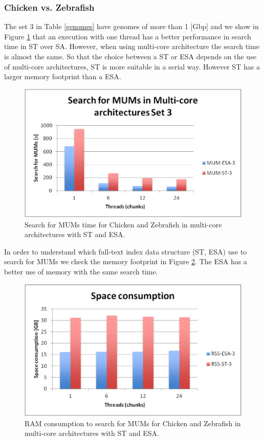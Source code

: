 \documentclass[runningheads,a4paper]{llncs}
\begin{document}
\subsubsection{Chicken vs. Zebrafish}
The set 3 in Table \ref{genomes} have genomes of more than 1 [Gbp] and we show in Figure \ref{fig:chicken-mum} that an execution with one thread has a better performance in search time in ST over SA. However, when using multi-core architecture the search time is almost the same. So that the choice between a ST or ESA depends on the use of multi-core architectures, ST is more suitable in a serial way. However ST has a larger memory footprint than a ESA.
\begin{figure}[h]
  \centering
  \includegraphics[scale=0.3]{chicken-MUM.eps}
  \caption{Search for MUMs time for Chicken and Zebrafish in multi-core architectures with ST and ESA.}
  \label{fig:chicken-mum}
\end{figure}  
In order to understand which full-text index data structure (ST, ESA) use to search for MUMs we check the memory footprint in Figure \ref{fig:chicken-ram}. The ESA has a better use of memory with the same search time.
\begin{figure}[h]
  \centering
  \includegraphics[scale=0.3]{chicken-RAM.eps}
  \caption{RAM consumption to search for MUMs for Chicken and Zebrafish in multi-core architectures with ST and ESA.}
  \label{fig:chicken-ram}
\end{figure}  
\end{document}
